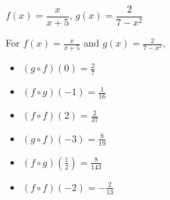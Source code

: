 {$f(x) = \dfrac{x}{x+5}$, $g(x) = \dfrac{2}{7-x^2}$}
{For  $f(x) = \frac{x}{x+5}$ and $g(x) = \frac{2}{7-x^2}$,
\begin{multicols}{2}

\begin{itemize}

\item  $(g\circ f)(0) = \frac{2}{7}$

\item  $(f\circ g)(-1) = \frac{1}{16}$

\item  $(f \circ f)(2) = \frac{2}{37}$

\item  $(g\circ f)(-3) = \frac{8}{19}$

\item  $(f\circ g)\left(\frac{1}{2}\right) = \frac{8}{143}$

\item  $(f \circ f)(-2) = -\frac{2}{13}$

\end{itemize}

\end{multicols}
}